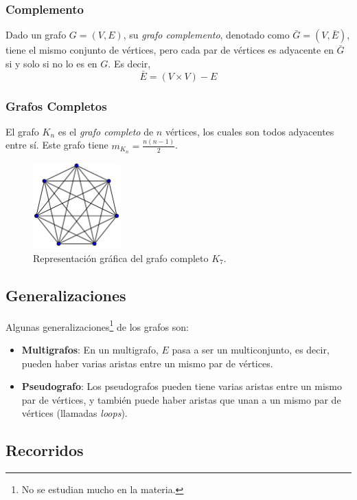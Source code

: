 \documentclass[a4paper]{report}
\begin{document}
\subsubsection{Complemento}

Dado un grafo $G = (V, E)$, su \textit{grafo complemento}, denotado como $\bar{G} = (V, \bar{E})$, tiene el mismo conjunto de vértices, pero cada par de vértices es adyacente en $\bar{G}$ si y solo si no lo es en $G$. Es decir,
$$\bar{E} = (V \times V) - E$$

\subsubsection{Grafos Completos}

El grafo $K_n$ es el \textit{grafo completo} de $n$ vértices, los cuales son todos adyacentes entre sí. Este grafo tiene $m_{K_n} = \frac{n(n-1)}{2}$.

\begin{figure}[H]
    \centering
    \includegraphics[width=0.3\textwidth]{K7.png}
    \caption*{Representación gráfica del grafo completo $K_7$.}
\end{figure}

\subsection{Generalizaciones}

Algunas generalizaciones\footnote{No se estudian mucho en la materia.} de los grafos son:
\begin{itemize}
    \item \textbf{Multigrafos}: En un multigrafo, $E$ pasa a ser un multiconjunto, es decir, pueden haber varias aristas entre un mismo par de vértices.
    \item \textbf{Pseudografo}: Los pseudografos pueden tiene varias aristas entre un mismo par de vértices, y también puede haber aristas que unan a un mismo par de vértices (llamadas \textit{loops}).
\end{itemize}

\subsection{Recorridos}
\end{document}
